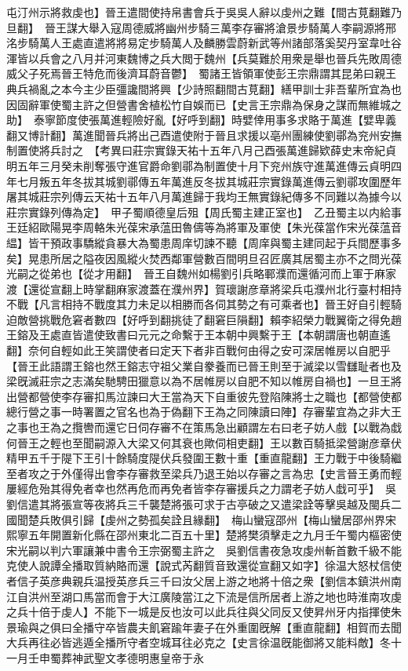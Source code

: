 屯汀州示將救虔也】晉王遣間使持帛書會兵于吳吳人辭以虔州之難【間古莧翻難乃旦翻】　晉王謀大舉入寇周德威將幽州步騎三萬李存審將滄景步騎萬人李嗣源將邢洺步騎萬人王處直遣將將易定步騎萬人及麟勝雲蔚新武等州諸部落奚契丹室韋吐谷渾皆以兵會之八月并河東魏博之兵大閲于魏州【兵莫難於用衆是舉也晉兵先敗周德威父子死焉晉王特危而後濟耳蔚音鬱】　蜀諸王皆領軍使彭王宗鼎謂其昆弟曰親王典兵禍亂之本今主少臣彊讒間將興【少詩照翻間古莧翻】繕甲訓士非吾輩所宜為也因固辭軍使蜀主許之但營書舍植松竹自娛而已【史言王宗鼎為保身之謀而無維城之助】　泰寧節度使張萬進輕險好亂【好呼到翻】時嬖倖用事多求賂于萬進【嬖卑義翻又博計翻】萬進聞晉兵將出己酉遣使附于晉且求援以亳州團練使劉鄩為兖州安撫制置使將兵討之　【考異曰莊宗實錄天祐十五年八月己酉張萬進歸欵薛史末帝紀貞明五年三月癸未削奪張守進官爵命劉鄩為制置使十月下兖州族守進萬進傳云貞明四年七月叛五年冬拔其城劉鄩傳五年萬進反冬拔其城莊宗實錄萬進傳云劉鄩攻圍歷年屠其城莊宗列傳云天祐十五年八月萬進歸于我均王無實錄紀傳多不同難以為據今以莊宗實錄列傳為定】　甲子蜀順德皇后殂【周氏蜀主建正室也】　乙丑蜀主以内給事王廷紹歐陽晃李周輅朱光葆宋承蕰田魯儔等為將軍及軍使【朱光葆當作宋光葆蕰音緼】皆干預政事驕縱貪暴大為蜀患周庠切諫不聽【周庠與蜀主建同起于兵間歷事多矣】晃患所居之隘夜因風縱火焚西鄰軍營數百間明旦召匠廣其居蜀主亦不之問光葆光嗣之從弟也【從才用翻】　晉王自魏州如楊劉引兵略鄆濮而還循河而上軍于麻家渡【還從宣翻上時掌翻麻家渡蓋在濮州界】賀瓌謝彦章將梁兵屯濮州北行臺村相持不戰【凡言相持不戰度其力未足以相勝而各伺其勢之有可乘者也】晉王好自引輕騎迫敵營挑戰危窘者數四【好呼到翻挑徒了翻窘巨隕翻】賴李紹榮力戰翼衛之得免趙王鎔及王處直皆遣使致書曰元元之命繫于王本朝中興繫于王【本朝謂唐也朝直遙翻】奈何自輕如此王笑謂使者曰定天下者非百戰何由得之安可深居帷房以自肥乎【晉王此語謂王鎔也然王鎔志守祖父業自豢養而已晉王則至于滅梁以雪讎耻者也及梁旣滅莊宗之志滿矣馳騁田獵意以為不居帷房以自肥不知以帷房自禍也】一旦王將出營都營使李存審扣馬泣諫曰大王當為天下自重彼先登陷陳將士之職也【都營使都總行營之事一時署置之官名也為于偽翻下王為之同陳讀曰陣】存審輩宜為之非大王之事也王為之攬轡而還它日伺存審不在策馬急出顧謂左右曰老子妨人戲【以戰為戱何晉王之輕也至聞嗣源入大梁又何其衰也歟伺相吏翻】王以數百騎抵梁營謝彦章伏精甲五千于隄下王引十餘騎度隄伏兵發圍王數十重【重直龍翻】王力戰于中後騎繼至者攻之于外僅得出會李存審救至梁兵乃退王始以存審之言為忠【史言晉王勇而輕屢經危殆其得免者幸也然再危而再免者皆李存審援兵之力謂老子妨人戱可乎】　吳劉信遣其將張宣等夜將兵三千襲楚將張可求于古亭破之又遣梁詮等擊吳越及閩兵二國聞楚兵敗俱引歸【虔州之勢孤矣詮且緣翻】　梅山蠻寇邵州【梅山蠻居邵州界宋熙寧五年開置新化縣在邵州東北二百五十里】楚將樊須擊走之九月壬午蜀内樞密使宋光嗣以判六軍讓兼中書令王宗弼蜀主許之　吳劉信書夜急攻虔州斬首數千級不能克使人說譚全播取質納賂而還【說式芮翻質音致還從宣翻又如字】徐温大怒杖信使者信子英彦典親兵温授英彦兵三千曰汝父居上游之地將十倍之衆【劉信本鎮洪州南江自洪州至湖口馬當而會于大江廣陵當江之下流是信所居者上游之地也時淮南攻虔之兵十倍于虔人】不能下一城是反也汝可以此兵往與父同反又使昇州牙内指揮使朱景瑜與之俱曰全播守卒皆農夫飢窘踰年妻子在外重圍旣解【重直龍翻】相賀而去聞大兵再往必皆逃遁全播所守者空城耳往必克之【史言徐温旣能御將又能料敵】冬十一月壬申蜀葬神武聖文孝德明惠皇帝于永

